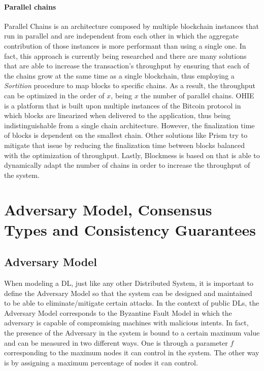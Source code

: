 
\paragraph{Parallel chains}

Parallel Chains is an architecture composed by multiple blockchain instances that run in parallel and are independent from each other in which the aggregate contribution of those instances is more performant than using a single one. In fact, this approach is currently being researched \cite{parallel_chains} and there are many solutions that are able to increase the transaction's throughput by ensuring that each of the chains grow at the same time as a single blockchain, thus employing a \textit{Sortition} procedure to map blocks to specific chains. As a result, the throughput can be optimized in the order of $x$, being $x$ the number of parallel chains. OHIE \cite{ohie} is a platform that is built upon multiple instances of the Bitcoin protocol in which blocks are linearized when delivered to the application, thus being indistinguishable from a single chain architecture. However, the finalization time of blocks is dependent on the smallest chain. Other solutions like Prism \cite{prism} try to mitigate that issue by reducing the finalization time between blocks balanced with the optimization of throughput. Lastly, Blockmess \cite{blockmess} is based on \cite{parallel_chains, ohie} that is able to dynamically adapt the number of chains in order to increase the throughput of the system.


\section{Adversary Model, Consensus Types and Consistency Guarantees}
\label{sec:rel_work:adversary_model-consensus-consistency}

\subsection{Adversary Model}

When modeling a \gls{DL}, just like any other Distributed System, it is important to define the Adversary Model so that the system can be designed and maintained to be able to eliminate/mitigate certain attacks. In the context of public \gls{DL}s, the Adversary Model corresponds to the Byzantine Fault Model in which the adversary is capable of compromising machines with malicious intents. In fact, the presence of the Adversary in the system is bound to a certain maximum value and can be measured in two different ways. One is through a parameter $f$ corresponding to the maximum nodes it can control in the system. The other way is by assigning a maximum percentage of nodes it can control.

